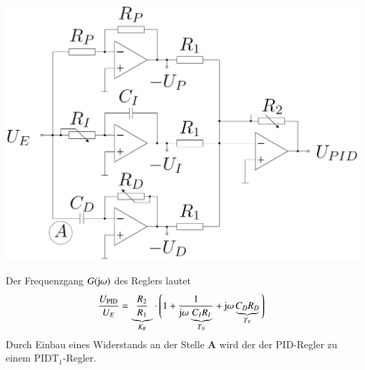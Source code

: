 \begin{minipage}[c]{0.45\columnwidth}
    \includegraphics[width=\columnwidth]{images/realisierung_pid-regler_variante_2.png}
\end{minipage}
\hfill
\begin{minipage}[c]{0.52\columnwidth}
    Der Frequenzgang $G(\mathrm{j} \omega)$ des Reglers lautet
    $$ \frac{U_{\rm PID}}{U_E} = \underbrace{ \frac{R_2}{R_1} }_{K_R} \cdot \Bigg\lgroup 1 + \frac{1}{\mathrm{j} \omega \underbrace{C_I R_I}_{T_N}} 
        + \mathrm{j} \omega \underbrace{ C_D R_D }_{T_V} \Bigg\rgroup $$
    Durch Einbau eines Widerstands an der Stelle \textbf{A} wird der der PID-Regler zu einem $\text{PIDT}_1$-Regler.
\end{minipage}

